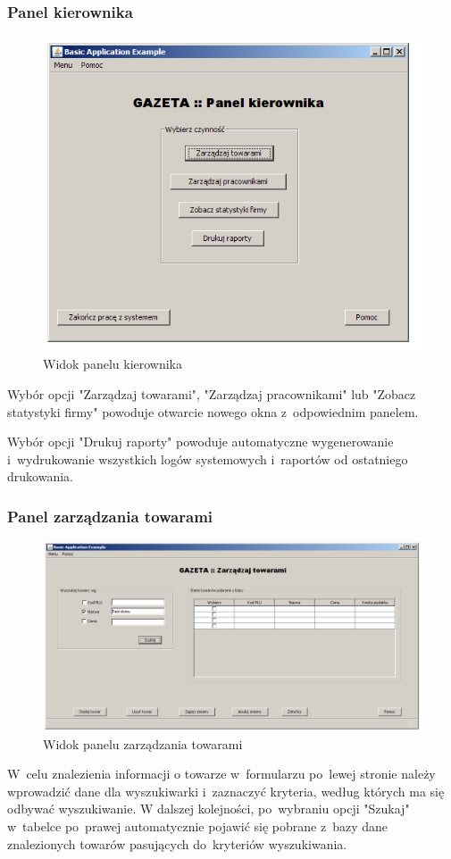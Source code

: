 \subsubsection{Panel kierownika}
\begin{figure}
\includegraphics[width=1\textwidth]{gfx/szef_szefow.png}
\caption{Widok panelu kierownika}
\end{figure}
Wybór opcji "Zarządzaj towarami", "Zarządzaj pracownikami" lub "Zobacz statystyki firmy" powoduje otwarcie nowego okna z~odpowiednim panelem.

Wybór opcji "Drukuj raporty" powoduje automatyczne wygenerowanie i~wydrukowanie wszystkich logów systemowych i~raportów od ostatniego drukowania.
\subsubsection{Panel zarządzania towarami}
\begin{figure}
\includegraphics[width=1\textwidth]{gfx/zarzadzaj_towarami.png}
\caption{Widok panelu zarządzania towarami}
\end{figure}
W~celu znalezienia informacji o towarze w~formularzu po~lewej stronie należy wprowadzić dane dla wyszukiwarki i~zaznaczyć kryteria, według których ma się odbywać wyszukiwanie. W dalszej kolejności, po~wybraniu opcji "Szukaj" w~tabelce po~prawej automatycznie pojawić się pobrane z~bazy dane znalezionych towarów pasujących do~kryteriów wyszukiwania.

